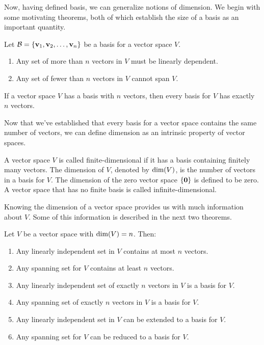 \documentclass[../m73main.tex]{chapters}
\begin{document}
Now, having defined basis, we can generalize notions of dimension.
We begin with some motivating theorems, both of which establish the size of a basis as an important quantity.

\begin{theorem}
	Let $\mathcal{B} = \{\mathbf{v}_1, \mathbf{v}_2, \ldots, \mathbf{v}_n\}$ be a basis for a vector space $V$.
	\begin{enumerate}[label=(\alph*)]
		\item Any set of more than $n$ vectors in $V$ must be linearly dependent.
		\item Any set of fewer than $n$ vectors in $V$ cannot span $V$.
	\end{enumerate}
\end{theorem}

\begin{theorem}
	If a vector space $V$ has a basis with $n$ vectors, then every basis for $V$ has exactly $n$ vectors.
\end{theorem}

Now that we've established that every basis for a vector space contains the same number of vectors, we can define dimension as an intrinsic property of vector spaces.

\begin{definition}[Dimension]
	A vector space $V$ is called finite-dimensional if it has a basis containing finitely many vectors.
	The dimension of $V$, denoted by $\textrm{dim}(V)$, is the number of vectors in a basis for $V$.
	The dimension of the zero vector space $\{\mathbf{0}\}$ is defined to be zero.
	A vector space that has no finite basis is called infinite-dimensional.
\end{definition}

Knowing the dimension of a vector space provides us with much information about $V$.
Some of this information is described in the next two theorems.

\begin{theorem}
	Let $V$ be a vector space with $\textrm{dim}(V) = n$.
	Then:
	\begin{enumerate}[label=(\alph*)]
		\item Any linearly independent set in $V$ contains at most $n$ vectors.
		\item Any spanning set for $V$ contains at least $n$ vectors.
		\item Any linearly independent set of exactly $n$ vectors in $V$ is a basis for $V$.
		\item Any spanning set of exactly $n$ vectors in $V$ is a basis for $V$.
		\item Any linearly independent set in $V$ can be extended to a basis for $V$.
		\item Any spanning set for $V$ can be reduced to a basis for $V$.
	\end{enumerate}
\end{theorem}
\end{document}
